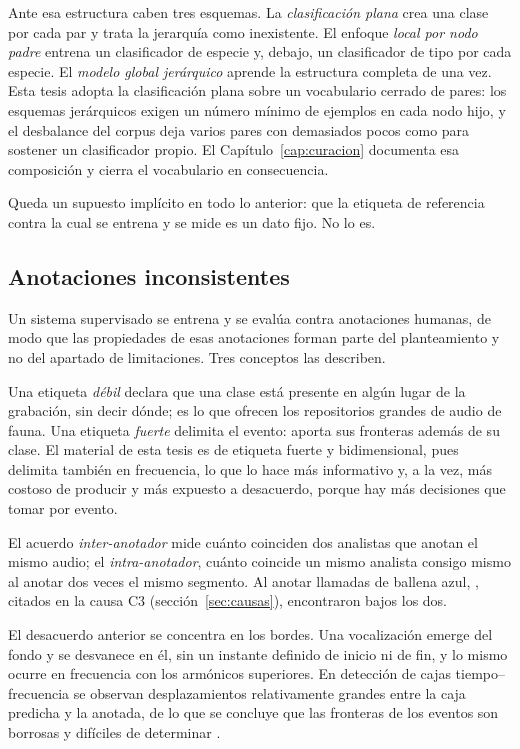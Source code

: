Ante esa estructura caben tres esquemas. La \emph{clasificación plana} crea una
clase por cada par y trata la jerarquía como inexistente. El enfoque \emph{local
    por nodo padre} entrena un clasificador de especie y, debajo, un clasificador de
tipo por cada especie. El \emph{modelo global jerárquico} aprende la estructura
completa de una vez. Esta tesis adopta la clasificación plana sobre un
vocabulario cerrado de pares: los esquemas jerárquicos exigen un número mínimo de
ejemplos en cada nodo hijo, y el desbalance del corpus deja varios pares con
demasiados pocos como para sostener un clasificador propio. El
Capítulo~\ref{cap:curacion} documenta esa composición y cierra el vocabulario en
consecuencia.

Queda un supuesto implícito en todo lo anterior: que la etiqueta de referencia
contra la cual se entrena y se mide es un dato fijo. No lo es.

\subsection{Anotaciones inconsistentes}

Un sistema supervisado se entrena y se evalúa contra anotaciones humanas, de modo
que las propiedades de esas anotaciones forman parte del planteamiento y no del
apartado de limitaciones. Tres conceptos las describen.

 Una etiqueta \emph{débil} declara que
una clase está presente en algún lugar de la grabación, sin decir dónde; es lo
que ofrecen los repositorios grandes de audio de fauna. Una etiqueta
\emph{fuerte} delimita el evento: aporta sus fronteras además de su clase. El
material de esta tesis es de etiqueta fuerte y bidimensional, pues delimita también
en frecuencia, lo que lo hace más informativo y, a la vez, más costoso de
producir y más expuesto a desacuerdo, porque hay más decisiones que tomar por
evento.

 El acuerdo
\emph{inter-anotador} mide cuánto coinciden dos analistas que anotan el mismo
audio; el \emph{intra-anotador}, cuánto coincide un mismo analista consigo mismo
al anotar dos veces el mismo segmento. Al anotar llamadas de ballena azul,
\citet{leroy_reliability_2018}, citados en la causa C3 (sección~\ref{sec:causas}),
encontraron bajos los dos.

 El desacuerdo anterior se concentra en los
bordes. Una vocalización emerge del fondo y se desvanece en él, sin un instante
definido de inicio ni de fin, y lo mismo ocurre en frecuencia con los armónicos superiores. En detección de
cajas tiempo--frecuencia se observan desplazamientos relativamente grandes entre
la caja predicha y la anotada, de lo que se concluye que las fronteras de los
eventos son borrosas y difíciles de determinar \citep{zhu_sound_2025}.

